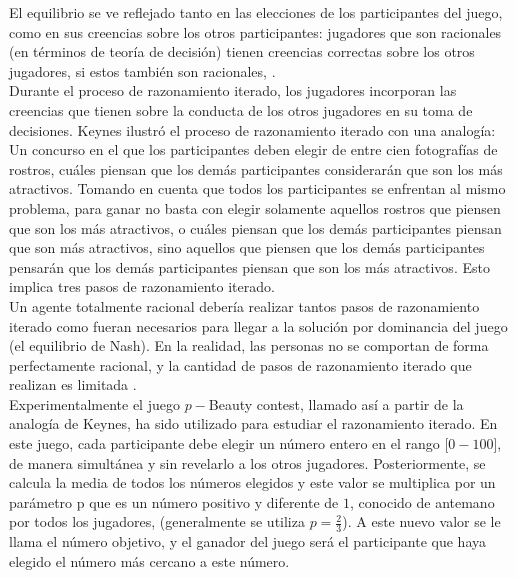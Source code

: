 El equilibrio se ve reflejado tanto en las elecciones de los participantes del juego, como en sus creencias sobre los otros participantes: jugadores que son racionales (en términos de teoría de decisión) tienen creencias correctas sobre los otros jugadores, si estos también son racionales, \parencite{Crawford2013}.\\

Durante el proceso de razonamiento iterado, los jugadores incorporan las creencias que tienen sobre la conducta de los otros jugadores en su toma de decisiones. Keynes \parencite*{Keynes1956} ilustró el proceso de razonamiento iterado con una analogía: Un concurso en el que los participantes deben elegir de entre cien fotografías de rostros, cuáles piensan que los demás participantes considerarán que son los más atractivos. Tomando en cuenta que todos los participantes se enfrentan al mismo problema, para ganar no basta con elegir solamente aquellos rostros que piensen que son los más atractivos, o cuáles piensan que los demás participantes piensan que son más atractivos, sino aquellos que piensen que los demás participantes pensarán que los demás participantes piensan que son los más atractivos. Esto implica tres pasos de razonamiento iterado.\\

Un agente totalmente racional debería realizar tantos pasos de razonamiento iterado como fueran necesarios para llegar a la solución por dominancia del juego (el equilibrio de Nash). En la realidad, las personas no se comportan de forma perfectamente racional, y la cantidad de pasos de razonamiento iterado que realizan es limitada \parencite{Stahl1995, Ho1998}.\\

Experimentalmente el juego $p-$Beauty contest, llamado así a partir de la analogía de Keynes, ha sido utilizado para estudiar el razonamiento iterado. En este juego, cada participante debe elegir un número entero en el rango [$0 - 100$], de manera simultánea y sin revelarlo a los otros jugadores. Posteriormente, se calcula la media de todos los números elegidos y este valor se multiplica por un parámetro p que es un número positivo y diferente de $1$, conocido de antemano por todos los jugadores, (generalmente se utiliza $p = \frac{2}{3}$). A este nuevo valor se le llama el número objetivo, y el ganador del juego será el participante que haya elegido el número más cercano a este número.\\

